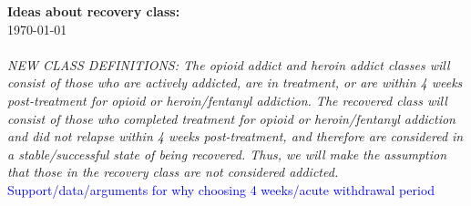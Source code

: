 \documentclass[12pt]{article}
\begin{document}
\noindent \textbf{Ideas about recovery class:} \\ 
\today \\ \\
\textit{NEW CLASS DEFINITIONS: The opioid addict and heroin addict classes will consist of those who are actively addicted, are in treatment, or are within 4 weeks post-treatment for opioid or heroin/fentanyl addiction. The recovered class will consist of those who completed treatment for opioid or heroin/fentanyl addiction and did not relapse within 4 weeks post-treatment, and therefore are considered in a stable/successful state of being recovered. Thus, we will make the assumption that those in the recovery class are not considered addicted.}\\

\textcolor{blue}{Support/data/arguments for why choosing 4 weeks/acute withdrawal period} \\
\end{document}
